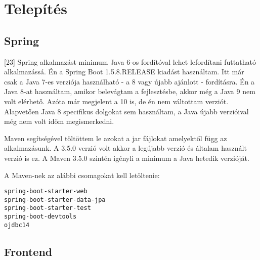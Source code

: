



\section{Telepítés}
\subsection{Spring}

\begin{comment}{Ez a rész is lehet kicsit tárgyilagosabb}
\end{comment}

[23] Spring alkalmazást minimum Java 6-os fordítóval lehet lefordítani futtatható alkalmazássá. Én a Spring Boot 1.5.8.RELEASE kiadást használtam. Itt már csak a Java 7-es verziója használható - a 8 vagy újabb ajánlott - fordításra. Én a Java 8-at használtam, amikor belevágtam a fejlesztésbe, akkor még a Java 9 nem volt elérhető. Azóta már megjelent a 10 is, de én nem váltottam verziót. Alapvetően Java 8 specifikus dolgokat sem használtam, a Java újabb verzióival még nem volt időm megismerkedni.

Maven segítségével töltöttem le azokat a jar fájlokat amelyektől függ az alkalmazásunk. A 3.5.0 verzió volt akkor a legújabb verzió és általam használt verzió is ez. A Maven 3.5.0 szintén igényli a minimum a Java hetedik verzióját.

A Maven-nek az alábbi csomagokat kell letöltenie:
\begin{verbatim}
spring-boot-starter-web
spring-boot-starter-data-jpa
spring-boot-starter-test
spring-boot-devtools
ojdbc14
\end{verbatim}


\subsection{Frontend}

